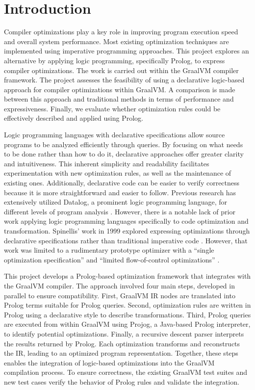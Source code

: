 \chapter[Introduction]{Introduction}

Compiler optimizations play a key role in improving program execution speed and overall system performance. Most existing optimization techniques are implemented using imperative programming approaches. This project explores an alternative by applying logic programming, specifically Prolog, to express compiler optimizations. The work is carried out within the GraalVM compiler framework. The project assesses the feasibility of using a declarative logic-based approach for compiler optimizations within GraalVM. A comparison is made between this approach and traditional methods in terms of performance and expressiveness. Finally, we evaluate whether optimization rules could be effectively described and applied using Prolog.

Logic programming languages with declarative specifications allow source programs to be analyzed efficiently through queries. By focusing on what needs to be done rather than how to do it, declarative approaches offer greater clarity and intuitiveness. This inherent simplicity and readability facilitates experimentation with new optimization rules, as well as the maintenance of existing ones. Additionally, declarative code can be easier to verify correctness because it is more straightforward and easier to follow. Previous research has extensively utilized Datalog, a prominent logic programming language, for different levels of program analysis \cite{Bravenboer2009,Tonder2021,Lam2005,Benton2007}. However, there is a notable lack of prior work applying logic programming languages specifically to code optimization and transformation. Spinellis’ work in 1999 explored expressing optimizations through declarative specifications rather than traditional imperative code \cite{Spinellis1999}. However, that work was limited to a rudimentary prototype optimizer with a ``single optimization specification'' and ``limited flow-of-control optimizations'' \cite{Spinellis1999}.

This project develops a Prolog-based optimization framework that integrates with the GraalVM compiler. The approach involved four main steps, developed in parallel to ensure compatibility. 
First, GraalVM IR nodes are translated into Prolog terms suitable for Prolog queries.
Second, optimization rules are written in Prolog using a declarative style to describe transformations. 
Third, Prolog queries are executed from within GraalVM using Projog, a Java-based Prolog interpreter, to identify potential optimizations. Finally, a recursive descent parser interprets the results returned by Prolog. Each optimization transforms and reconstructs the IR, leading to an optimized program representation.
Together, these steps enables the integration of logic-based optimizations into the GraalVM compilation process. 
To ensure correctness, the existing GraalVM test suites and new test cases verify the behavior of Prolog rules and validate the integration.


